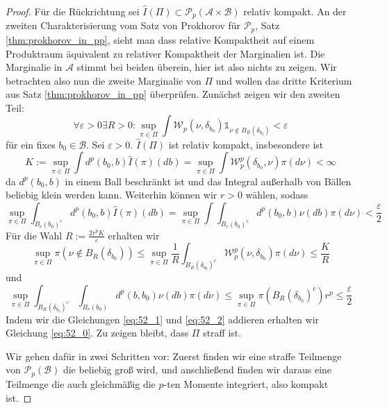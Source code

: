 \begin{proof}
    Für die Rückrichtung sei $\hat{I}(\Pi) \subset \mathcal{P}_p(\mathcal{A}\times \mathcal{B})$ relativ kompakt. An der zweiten Charakterisierung vom Satz von Prokhorov für $\mathcal{P}_p$, Satz \ref{thm:prokhorov_in_pp}, sieht man dass relative Kompaktheit auf einem Produktraum äquivalent zu relativer Kompaktheit der Marginalien ist. Die Marginalie in $\mathcal{A}$ stimmt bei beiden überein, hier ist also nichts zu zeigen. Wir betrachten also nun die zweite Marginalie von $\Pi$ und wollen das dritte Kriterium aus Satz \ref{thm:prokhorov_in_pp} überprüfen. Zunächst zeigen wir den zweiten Teil:
    \begin{equation}\label{eq:52_0}
        \forall \varepsilon > 0 \exists R>0: \sup_{\pi \in \Pi} \int \mathcal{W}_p(\nu, \delta_{b_0}) \mathds{1}_{\nu \notin B_R(\delta_{b_0})} < \varepsilon
    \end{equation}
    für ein fixes $b_0 \in \mathcal{B}$. Sei $\varepsilon > 0$. $\hat{I}(\Pi)$ ist relativ kompakt, insbesondere ist 
    $$K:=\sup_{\pi \in \Pi} \int d^p(b_0, b) \hat{I}(\pi)(db) = \sup_{\pi \in \Pi} \int \mathcal{W}_p^p(\delta_{b_0}, \nu) \pi(d\nu) < \infty$$
    da $d^p(b_0, b)$ in einem Ball beschränkt ist und das Integral außerhalb von Bällen beliebig klein werden kann. Weiterhin können wir $r>0$ wählen, sodass
    \begin{equation}\label{eq:52_1}
        \sup_{\pi \in \Pi} \int_{B_r(b_0)^c} d^p(b_0, b) \hat{I}(\pi)(db) = \sup_{\pi \in \Pi} \int \int_{B_r(b_0)^c}d^p(b_0, b) \nu(db) \pi(d\nu) < \frac{\varepsilon}{2}
    \end{equation}
    Für die Wahl $R:=\frac{2r^pK}{\varepsilon}$ erhalten wir 
    $$\sup_{\pi \in \Pi} \pi(\nu \notin B_R(\delta_{b_0})) \leq \sup_{\pi \in \Pi} \frac{1}{R} \int_{B_R(\delta_{b_0})^c} \mathcal{W}_p^p(\nu, \delta_{b_0})\pi(d\nu) \leq \frac{K}{R}$$
    und 
    \begin{equation}\label{eq:52_2}
        \sup_{\pi \in \Pi} \int_{B_R(\delta_{b_0})^c} \int_{B_r(b_0)} d^p(b, b_0)\nu(db)\pi(d\nu) \leq \sup_{\pi\in\Pi} \pi(B_R(\delta_{b_0})^c) r^p \leq \frac{\varepsilon}{2}
    \end{equation}
    Indem wir die Gleichungen \ref{eq:52_1} und \ref{eq:52_2} addieren erhalten wir Gleichung \ref{eq:52_0}. Zu zeigen bleibt, dass $\Pi$ straff ist.

    Wir gehen dafür in zwei Schritten vor: Zuerst finden wir eine straffe Teilmenge von $\mathcal{P}_p(\mathcal{B})$ die beliebig groß wird, und anschließend finden wir daraus eine Teilmenge die auch gleichmäßig die $p$-ten Momente integriert, also kompakt ist.


\end{proof}
